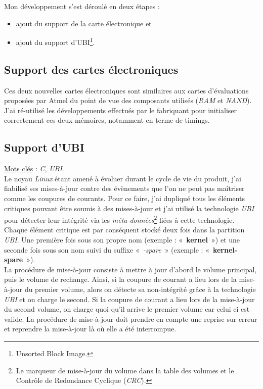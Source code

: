 \documentclass[a4paper]{article}
\begin{document}
Mon développement s'est déroulé en deux étapes :
\begin{itemize}
\item ajout du support de la carte électronique et
\item ajout du support d'UBI\footnote{Unsorted Block Image.}.
\end{itemize}

\subsection{Support des cartes électroniques}

Ces deux nouvelles cartes électroniques sont similaires aux cartes d'évaluations proposées par Atmel du point de vue des composants utilisés (\textit{RAM} et \textit{NAND}). J'ai ré-utilisé les développements effectués par le fabriquant pour initialiser correctement ces deux mémoires, notamment en terme de timings.

\subsection{Support d'UBI}

\underline{Mots clés} : \textit{C}, \textit{UBI}.\\

Le noyau \textit{Linux} étant amené à évoluer durant le cycle de vie du produit, j'ai fiabilisé ses mises-à-jour contre des évènements que l'on ne peut pas maîtriser comme les coupures de courants. Pour ce faire, j'ai dupliqué tous les éléments critiques pouvant être soumis à des mises-à-jour et j'ai utilisé la technologie \textit{UBI} pour détecter leur intégrité via les \textit{méta-données}\footnote{Le marqueur de mise-à-jour du volume dans la table des volumes et le Contrôle de Redondance Cyclique (\textit{CRC}).} liées à cette technologie.\\

Chaque élément critique est par conséquent stocké deux fois dans la partition \textit{UBI}. Une première fois sous son propre nom (exemple : «~\textbf{kernel}~») et une seconde fois sous son nom suivi du suffixe «~\textit{-spare}~» (exemple : «~\textbf{kernel-spare}~»).\\

La procédure de mise-à-jour consiste à mettre à jour d'abord le volume principal, puis le volume de rechange. Ainsi, si la coupure de courant a lieu lors de la mise-à-jour du premier volume, alors on détecte sa non-intégrité grâce à la technologie \textit{UBI} et on charge le second. Si la coupure de courant a lieu lors de la mise-à-jour du second volume, on charge quoi qu'il arrive le premier volume car celui ci est valide. La procédure de mise-à-jour doit prendre en compte une reprise sur erreur et reprendre la mise-à-jour là où elle a été interrompue.\\
\end{document}
